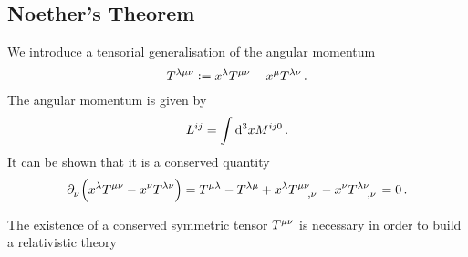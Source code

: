 \subsection{Noether's Theorem}
We introduce a tensorial generalisation of the angular momentum
\begin{equation}
    \tensor{T}{^\lambda^\mu^\nu}:=
    \tensor{x}{^\lambda}\tensor{T}{^\mu^\nu}-\tensor{x}{^\mu}\tensor{T}{^\lambda^\nu}\,
    .
\end{equation}
The angular momentum is given by
\begin{equation}
    \tensor{L}{^i^j} = \int\dif{}^3 x \tensor{M}{^i^j^0}\, .
\end{equation}
It can be shown that it is a conserved quantity
\begin{equation}
    \tensor{\partial}{_\nu}\left(\tensor{x}{^\lambda}\tensor{T}{^\mu^\nu}-\tensor{x}{^\nu}\tensor{T}{^\lambda^\nu}\right)
    =\tensor{T}{^\mu^\lambda}-\tensor{T}{^\lambda^\mu}+\tensor{x}{^\lambda}
    \tensor{T}{^\mu^\nu_,_\nu}-\tensor{x}{^\nu}\tensor{T}{^\lambda^\nu_,_\nu}=0\, .
\end{equation}
\begin{remark}
The existence of a conserved symmetric tensor $\tensor{T}{^\mu^\nu}$ is
necessary in order to build a relativistic theory
\end{remark}
